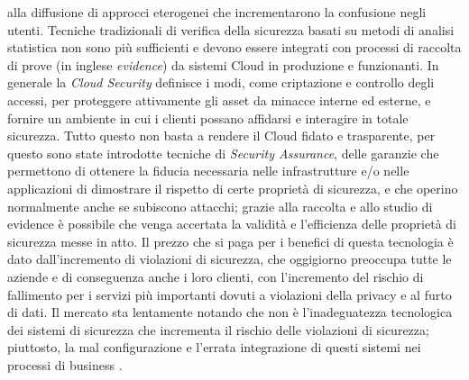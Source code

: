 alla diffusione di approcci eterogenei che incrementarono la confusione negli utenti.
Tecniche tradizionali di verifica della sicurezza basati su metodi di analisi statistica non sono più sufficienti e devono essere integrati 
con processi di raccolta di prove (in inglese \textit{evidence}) da sistemi Cloud in produzione e funzionanti.
In generale la \textit{Cloud Security} definisce i modi, come criptazione e controllo degli accessi, per proteggere attivamente gli asset 
da minacce interne ed esterne, e fornire un ambiente in cui i clienti possano affidarsi e interagire in totale sicurezza.\hfill\break
Tutto questo non basta a rendere il Cloud fidato e trasparente, per questo sono state introdotte tecniche di
\textit{Security Assurance}, delle garanzie che permettono di ottenere la fiducia necessaria nelle infrastrutture e/o nelle 
applicazioni di dimostrare il rispetto di certe proprietà di sicurezza, e che operino normalmente anche se subiscono attacchi; grazie 
alla raccolta e allo studio di evidence è possibile che venga accertata la validità e l'efficienza delle proprietà di sicurezza messe in 
atto. \hfill\break
Il prezzo che si paga per i benefici di questa tecnologia è dato dall'incremento di violazioni di sicurezza, che oggigiorno 
preoccupa tutte le aziende e di conseguenza anche i loro clienti, con l'incremento del rischio di fallimento per i servizi più importanti 
dovuti a violazioni della privacy e al furto di dati.
Il mercato sta lentamente notando che non è l'inadeguatezza tecnologica dei sistemi di sicurezza che incrementa il rischio delle 
violazioni di sicurezza; piuttosto, la mal configurazione e l'errata integrazione di questi sistemi nei processi di business 
\cite{cloud-Platform-for-ICT-Security-Governance}.\hfill\break
%
